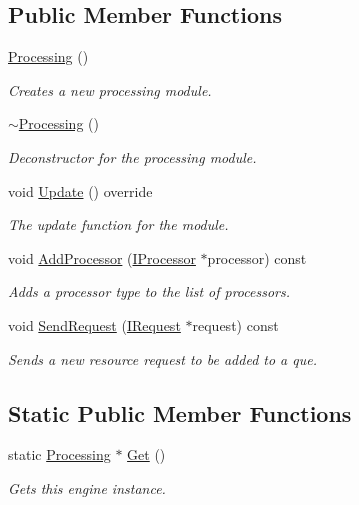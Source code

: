 \subsection*{Public Member Functions}
\begin{DoxyCompactItemize}
\item 
\hyperlink{class_flounder_1_1_processing_a3c38ca4fb85af3bf5b0b639a2705fb4d}{Processing} ()
\begin{DoxyCompactList}\small\item\em Creates a new processing module. \end{DoxyCompactList}\item 
\hyperlink{class_flounder_1_1_processing_a1abc720f74c9c06e5396bfcd66528f79}{$\sim$\+Processing} ()
\begin{DoxyCompactList}\small\item\em Deconstructor for the processing module. \end{DoxyCompactList}\item 
void \hyperlink{class_flounder_1_1_processing_a0527f549eb7ac350eb91b6851403784a}{Update} () override
\begin{DoxyCompactList}\small\item\em The update function for the module. \end{DoxyCompactList}\item 
void \hyperlink{class_flounder_1_1_processing_a9eef3faedd110d7bbbd125addce19430}{Add\+Processor} (\hyperlink{class_flounder_1_1_i_processor}{I\+Processor} $\ast$processor) const
\begin{DoxyCompactList}\small\item\em Adds a processor type to the list of processors. \end{DoxyCompactList}\item 
void \hyperlink{class_flounder_1_1_processing_a4c348c809e825456358f0eb22415396a}{Send\+Request} (\hyperlink{class_flounder_1_1_i_request}{I\+Request} $\ast$request) const
\begin{DoxyCompactList}\small\item\em Sends a new resource request to be added to a que. \end{DoxyCompactList}\end{DoxyCompactItemize}
\subsection*{Static Public Member Functions}
\begin{DoxyCompactItemize}
\item 
static \hyperlink{class_flounder_1_1_processing}{Processing} $\ast$ \hyperlink{class_flounder_1_1_processing_a14b3117c1ff8cb8436f2ddb8e7097e51}{Get} ()
\begin{DoxyCompactList}\small\item\em Gets this engine instance. \end{DoxyCompactList}\end{DoxyCompactItemize}
